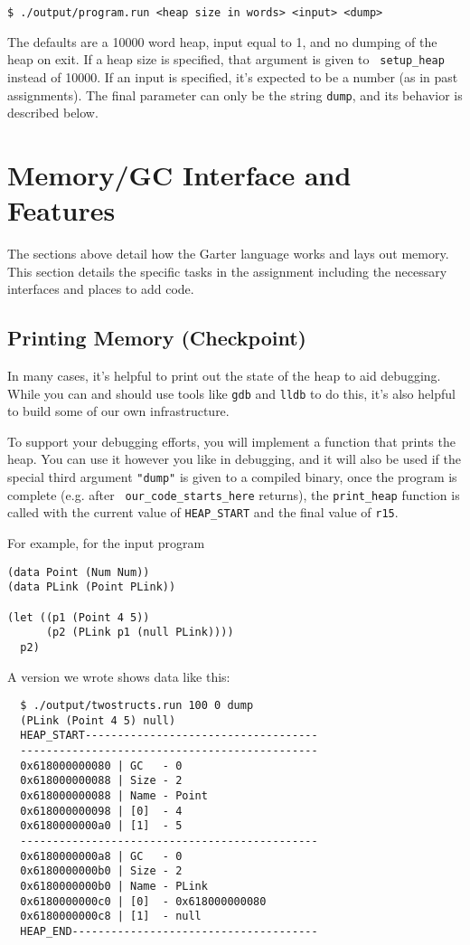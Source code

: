 \documentclass[10pt, oneside]{article}
\begin{document}
\begin{verbatim}
$ ./output/program.run <heap size in words> <input> <dump>
\end{verbatim}

The defaults are a 10000 word heap, input equal to 1, and no dumping of the
heap on exit. If a heap size is specified, that argument is given to {\tt
setup\_heap} instead of 10000. If an input is specified, it's expected to be
a number (as in past assignments). The final parameter can only be the string
{\tt dump}, and its behavior is described below.

\section*{Memory/GC Interface and Features}

The sections above detail how the Garter language works and lays out memory.
This section details the specific tasks in the assignment including the
necessary interfaces and places to add code.

\subsection*{Printing Memory (Checkpoint)}

In many cases, it's helpful to print out the state of the heap to aid
debugging. While you can and should use tools like {\tt gdb} and {\tt lldb}
to do this, it's also helpful to build some of our own infrastructure.

To support your debugging efforts, you will implement a function that prints
the heap. You can use it however you like in debugging, and it will also be
used if the special third argument {\tt "dump"} is given to a compiled
binary, once the program is complete (e.g. after {\tt
our\_code\_starts\_here} returns), the {\tt print\_heap} function is called
with the current value of {\tt HEAP\_START} and the final value of {\tt r15}.

For example, for the input program
\begin{verbatim}
(data Point (Num Num))
(data PLink (Point PLink))

(let ((p1 (Point 4 5))
      (p2 (PLink p1 (null PLink))))
  p2)
\end{verbatim}

A version we wrote shows data like this:

\begin{verbatim}
  $ ./output/twostructs.run 100 0 dump
  (PLink (Point 4 5) null)
  HEAP_START------------------------------------
  ----------------------------------------------
  0x618000000080 | GC   - 0
  0x618000000088 | Size - 2
  0x618000000088 | Name - Point
  0x618000000098 | [0]  - 4
  0x6180000000a0 | [1]  - 5
  ----------------------------------------------
  0x6180000000a8 | GC   - 0
  0x6180000000b0 | Size - 2
  0x6180000000b0 | Name - PLink
  0x6180000000c0 | [0]  - 0x618000000080
  0x6180000000c8 | [1]  - null
  HEAP_END--------------------------------------
\end{verbatim}
\end{document}
